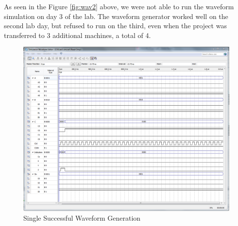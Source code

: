 \documentclass[a4paper,12pt]{article}
\begin{document}
As seen in the Figure \ref{fig:wav2} above, we were not able to run the waveform simulation on day 3 of the lab. The waveform generator worked well on the second lab day, but refused to run on the third, even when the project was transferred to 3 additional machines, a total of 4.

\begin{figure}[H]
\includegraphics[width=\textwidth]{Diagrams/WaveFormSimulation.PNG} 
\caption{Single Successful Waveform Generation}
\label{fig:wav1}
\end{figure}

\newpage
\end{document}
